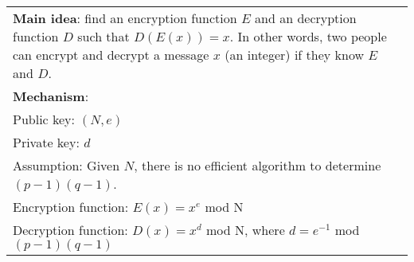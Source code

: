 {\tabulinesep=1mm
\begin{tabu}{|p{16cm} |}
\hline
\textbf{Main idea}: find an encryption function $E$ and an decryption function $D$ such that $D(E(x)) = x$. 
In other words, two people can encrypt and decrypt a message $x$ (an integer) if they know $E$ and $D$. \\
\textbf{Mechanism}:\\ 
Public key: $(N, e)$\\ 
Private key: $d$\\
Assumption: Given $N$, there is no efficient algorithm to determine $(p-1)(q-1)$. \\
Encryption function: $E(x) = x^e$ mod N\\ 
Decryption function: $D(x) = x^d$ mod N, where $d = e^{-1}$ mod$(p-1)(q-1)$\\	
\hline
\end{tabu}
}